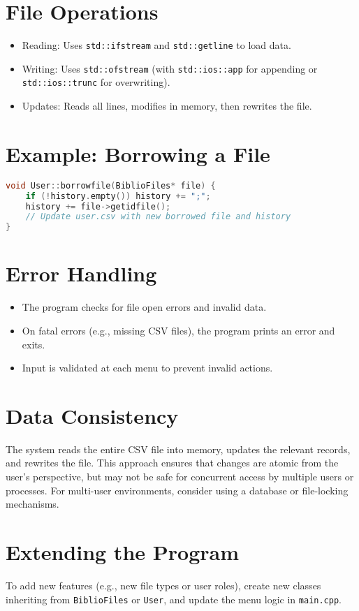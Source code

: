 \documentclass[a4paper,12pt]{article}
\begin{document}
\section{File Operations}
\begin{itemize}
    \item Reading: Uses \texttt{std::ifstream} and \texttt{std::getline} to load data.
    \item Writing: Uses \texttt{std::ofstream} (with \texttt{std::ios::app} for appending or \texttt{std::ios::trunc} for overwriting).
    \item Updates: Reads all lines, modifies in memory, then rewrites the file.
\end{itemize}

\section{Example: Borrowing a File}
\begin{lstlisting}[language=C++]
void User::borrowfile(BiblioFiles* file) {
    if (!history.empty()) history += ";";
    history += file->getidfile();
    // Update user.csv with new borrowed file and history
}
\end{lstlisting}

\section{Error Handling}
\begin{itemize}
    \item The program checks for file open errors and invalid data.
    \item On fatal errors (e.g., missing CSV files), the program prints an error and exits.
    \item Input is validated at each menu to prevent invalid actions.
\end{itemize}

\section{Data Consistency}
The system reads the entire CSV file into memory, updates the relevant records, and rewrites the file. This approach ensures that changes are atomic from the user's perspective, but may not be safe for concurrent access by multiple users or processes. For multi-user environments, consider using a database or file-locking mechanisms.

\section{Extending the Program}
To add new features (e.g., new file types or user roles), create new classes inheriting from \texttt{BiblioFiles} or \texttt{User}, and update the menu logic in \texttt{main.cpp}.
\end{document}
